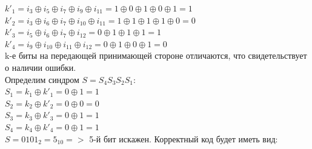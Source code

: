\documentclass[11pt]{article}
\begin{document}
$k'_1 = i_3 \oplus i_5 \oplus i_7 \oplus i_9 \oplus i_{11} = 1 \oplus 0 \oplus 1 \oplus 0 \oplus 1 = 1$ \\

$k'_2 = i_3 \oplus i_6 \oplus i_7 \oplus i_{10} \oplus i_{11} = 1 \oplus 1 \oplus 1 \oplus 1 \oplus 0 = 0$ \\

$k'_3 = i_5 \oplus i_6 \oplus i_7 \oplus i_{12} = 0 \oplus 1 \oplus 1 \oplus 1 = 1$ \\

$k'_4 = i_9 \oplus i_{10} \oplus i_{11} \oplus i_{12}= 0 \oplus 1 \oplus 0 \oplus 1 = 0$ \\

k-е биты на передающей принимающей стороне отличаются, что
свидетельствует о наличии ошибки.\\

Определим синдром $S = S_4 S_3 S_2 S_1$:\\

$S_1 = k_1 \oplus k'_1 = 0 \oplus 1 = 1$\\

$S_2 = k_2 \oplus k'_2 = 0 \oplus 0 = 0$\\

$S_3 = k_3 \oplus k'_3 = 0 \oplus 1 = 1$\\

$S_4 = k_4 \oplus k'_4 = 0 \oplus 1 = 1$\\

$S = 0101_2 = 5_{10} =>$ 5-й бит искажен. Корректный код будет иметь вид:

\begin{table}[H]
    \end{table}
\end{document}
